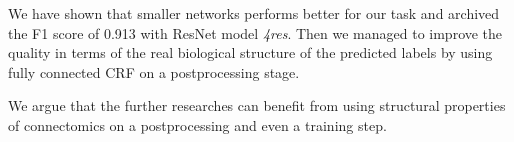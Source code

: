 \documentclass[twocolumn, a4paper]{article}
\theoremstyle{definition}
\begin{document}
We have shown that smaller networks performs better for our task and archived
the F1 score of 0.913 with ResNet model \textit{4res}. Then we managed to improve the quality in terms
of the real biological structure of the predicted labels by using
fully connected CRF on a postprocessing stage.

We argue that the further researches can benefit from using structural properties of connectomics on a postprocessing and even
a training step.




\end{document}
